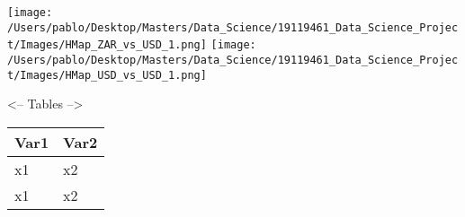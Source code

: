 \documentclass[
]{article}
\begin{document}
\texttt{[image: /Users/pablo/Desktop/Masters/Data\_Science/19119461\_Data\_Science\_Project/Images/HMap\_ZAR\_vs\_USD\_1.png]}
\texttt{[image: /Users/pablo/Desktop/Masters/Data\_Science/19119461\_Data\_Science\_Project/Images/HMap\_USD\_vs\_USD\_1.png]}

\textless-- Tables --\textgreater{}

\begin{longtable}[]{@{}ll@{}}
\toprule
Var1 & Var2 \\
\midrule
\endhead
x1 & x2 \\
x1 & x2 \\
\bottomrule
\end{longtable}
\end{document}
